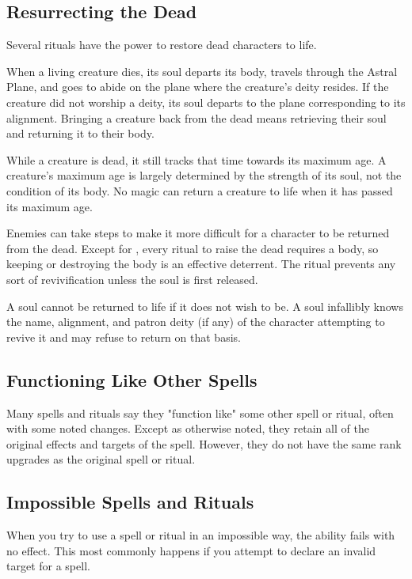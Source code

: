     \subsection{Resurrecting the Dead}\label{Resurrecting the Dead}
        Several rituals have the power to restore dead characters to life.

        When a living creature dies, its soul departs its body, travels through the Astral Plane, and goes to abide on the plane where the creature's deity resides.
        If the creature did not worship a deity, its soul departs to the plane corresponding to its alignment.
        Bringing a creature back from the dead means retrieving their soul and returning it to their body.

         While a creature is dead, it still tracks that time towards its maximum age.
        A creature's maximum age is largely determined by the strength of its soul, not the condition of its body.
        No magic can return a creature to life when it has passed its maximum age.

         Enemies can take steps to make it more difficult for a character to be returned from the dead.
        Except for , every ritual to raise the dead requires a body, so keeping or destroying the body is an effective deterrent.
        The  ritual prevents any sort of revivification unless the soul is first released.

         A soul cannot be returned to life if it does not wish to be.
        A soul infallibly knows the name, alignment, and patron deity (if any) of the character attempting to revive it and may refuse to return on that basis.

    \subsection{Functioning Like Other Spells}\label{Functioning Like Other Spells}
        Many spells and rituals say they "function like" some other spell or ritual, often with some noted changes.
        Except as otherwise noted, they retain all of the original effects and targets of the spell.
        However, they do not have the same rank upgrades as the original spell or ritual.

    \subsection{Impossible Spells and Rituals}
        When you try to use a spell or ritual in an impossible way, the ability fails with no effect.
        This most commonly happens if you attempt to declare an invalid target for a spell.

